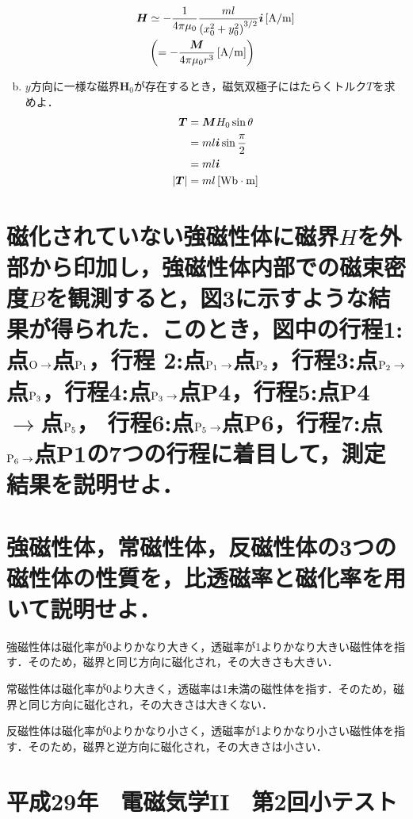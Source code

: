 \documentclass[dvipdfmx]{ujarticle}
\begin{document}
\begin{enumerate}[(a)]
	\begin{align*}
		\boldsymbol{H}&\simeq -\frac{1}{4\pi \mu_{0}}\frac{ml}{\left(x_{0}^{2}+y_{0}^{2}\right)^{3/2}} \boldsymbol{i}\,[\rm{A/m}]\\
		&\left(=-\frac{\boldsymbol{M}}{4\pi \mu_{0}r^{3}}\,[\rm{A/m}]\right)
	\end{align*}
	\item $y$方向に一様な磁界$\boldsymbol{H}_{0}$が存在するとき，磁気双極子にはたらくトルク$T$を求めよ．
	\begin{align*}
		\boldsymbol{T}&=\boldsymbol{M}H_{0}\sin \theta \\
		&=ml\boldsymbol{i}\sin \frac{\pi}{2}\\
		&=ml\boldsymbol{i}\\
		|\boldsymbol{T}|&=ml\,[\rm{Wb\cdot m}]
	\end{align*}
\end{enumerate}

\section{磁化されていない強磁性体に磁界$H$を外部から印加し，強磁性体内部での磁束密度$B$を観測すると，図3に示すような結果が得られた．このとき，図中の行程1:点$\rm{O}\to$点$\rm{P_{1}}$，行程 2:点$\rm{P_{1}}\to$点$\rm{P_{2}}$，行程3:点$\rm{P_{2}}\to$点$\rm{P_{3}}$，行程4:点$\rm{P_{3}}\to$点P4，行程5:点P4 $\to$点$\rm{P_{5}}$， 行程6:点$\rm{P_{5}}\to$点P6，行程7:点$\rm{P_{6}}\to$点P1の7つの行程に着目して，測定結果を説明せよ．}

\section{強磁性体，常磁性体，反磁性体の3つの磁性体の性質を，比透磁率と磁化率を用いて説明せよ．}
強磁性体は磁化率が0よりかなり大きく，透磁率が1よりかなり大きい磁性体を指す．そのため，磁界と同じ方向に磁化され，その大きさも大きい．

常磁性体は磁化率が0より大きく，透磁率は1未満の磁性体を指す．そのため，磁界と同じ方向に磁化され，その大きさは大きくない．

反磁性体は磁化率が0よりかなり小さく，透磁率が1よりかなり小さい磁性体を指す．そのため，磁界と逆方向に磁化され，その大きさは小さい．

\clearpage
\setcounter{section}{0}
\section*{平成29年　電磁気学II　第2回小テスト}
\end{document}
